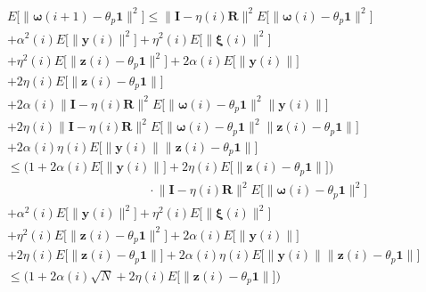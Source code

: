 \documentclass[journal]{IEEEtran}
\begin{document}
\vspace{-4mm}
\small
\begin{align}
&E\bigg[\Big\| \bm{\omega}(i+1) - \theta_p \mathbf{1}\Big\|^2\bigg] \le \Big\|\mathbf{I} - \eta(i)\mathbf{R}\Big\|^2  E\Big[\big\|\bm{\omega}(i)-\theta_p\mathbf{1}\big\|^2\Big] \nonumber \\
&+ \alpha^2(i)E\Big[\big\|\mathbf{y}(i)\big\|^2\Big] + \eta^2(i)E\Big[\big\|\bm{\xi}(i)\big\|^2\Big] \nonumber \\
&+ \eta^2(i)E\Big[\big\|\mathbf{z}(i) - \theta_p\mathbf{1}\big\|^2\Big] + 2\alpha(i) E\Big[\big\|\mathbf{y}(i)\big\|\Big] \nonumber \\
&+ 2\eta(i) E\Big[\big\|\mathbf{z}(i)- {\theta_p}\mathbf{1}\big\| \Big] \nonumber \\
&+ 2\alpha(i) \Big\|\mathbf{I} - \eta(i)\mathbf{R}  \Big\|^2 E\Big[\big\| \bm{\omega}(i) - {\theta_p}\mathbf{1} \big\|^2 \big\|\mathbf{y}(i)\big\| \Big]  \nonumber \\
&+ 2\eta(i) \Big\|\mathbf{I} - \eta(i)\mathbf{R}  \Big\|^2 E\Big[\big\| \bm{\omega}(i) - {\theta_p}\mathbf{1} \big\|^2 \big\|\mathbf{z}(i) - \theta_p \mathbf{1}\big\| \Big]  \nonumber \\
&+ 2\alpha(i)\eta(i) E \Big[\big\| \mathbf{y}(i) \big\| \big\|\mathbf{z}(i)- {\theta_p}\mathbf{1} \big\| \Big] \nonumber \\
&\le \bigg( 1 + 2\alpha(i)E\Big[\big\|\mathbf{y}(i)\big\|\Big] + 2\eta(i) E\Big[\big\|\mathbf{z}(i) - \theta_p \mathbf{1}\big\|\Big]\bigg)\nonumber \\
&\,\,\,\,\,\,\,\,\,\,\,\,\,\,\,\,\,\,\,\,\,\,\,\,\,\,\,\,\,\,\,\,\,\,\,\,\,\,\,\,\,\,\,\,\,\,\,\,\,\,\,\,\,\,\,\,\,\,\,\,\,\,\,\,\,\,\,\,\cdot\Big\|\mathbf{I} - \eta(i)\mathbf{R}\Big\|^2  E\Big[\big\|\bm{\omega}(i)-\theta_p\mathbf{1}\big\|^2\Big] \nonumber \\
&+ \alpha^2(i)E\Big[\big\|\mathbf{y}(i)\big\|^2\Big] + \eta^2(i)E\Big[\big\|\bm{\xi}(i)\big\|^2\Big] \nonumber \\
&+ \eta^2(i)E\Big[\big\|\mathbf{z}(i) - \theta_p\mathbf{1}\big\|^2\Big] + 2\alpha(i) E\Big[\big\|\mathbf{y}(i)\big\|\Big] \nonumber \\
&+ 2\eta(i) E\Big[\big\|\mathbf{z}(i)- {\theta_p}\mathbf{1}\big\| \Big] + 2\alpha(i)\eta(i) E \Big[ \big\| \mathbf{y}(i) \big\| \big\|\mathbf{z}(i)- {\theta_p}\mathbf{1} \big\| \Big] \nonumber \\
&\le \bigg( 1 + 2\alpha(i)\sqrt{N} + 2\eta(i) E\Big[\big\|\mathbf{z}(i) - \theta_p \mathbf{1}\big\|\Big] \bigg) \nonumber \\

\end{align}
\end{document}
